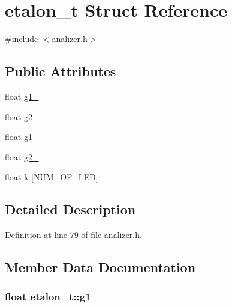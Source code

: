 \hypertarget{structetalon__t}{\section{etalon\+\_\+t Struct Reference}
\label{structetalon__t}
}


{\ttfamily \#include $<$analizer.\+h$>$}

\subsection*{Public Attributes}
\begin{DoxyCompactItemize}
\item 
float \hyperlink{structetalon__t_a571e664691346c16bbba387ea9602681}{g1\+\_}
\item 
float \hyperlink{structetalon__t_ace57ce9cb8103e1d334b8f54d37f11de}{g2\+\_}
\item 
float \hyperlink{structetalon__t_aada4338937cd62394d368a85228f045e}{g1\+\_}
\item 
float \hyperlink{structetalon__t_a77f1f89ca2ce92b762e43c9960248507}{g2\+\_}
\item 
float \hyperlink{structetalon__t_a70cad7a56e0aaeb8998957d09cf99599}{k} \mbox{[}\hyperlink{analizer_8h_a2bdaf37b88fc3b0920fffa2b6166be22}{N\+U\+M\+\_\+\+O\+F\+\_\+\+L\+E\+D}\mbox{]}
\end{DoxyCompactItemize}


\subsection{Detailed Description}


Definition at line 79 of file analizer.\+h.



\subsection{Member Data Documentation}
\hypertarget{structetalon__t_a571e664691346c16bbba387ea9602681}{
\subsubsection[{g1\+\_\+1}]{\setlength{\rightskip}{0pt plus 5cm}float etalon\+\_\+t\+::g1\+\_}}\label{structetalon__t_a571e664691346c16bbba387ea9602681}


